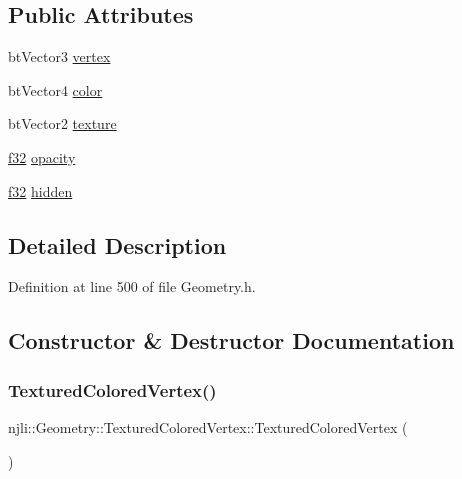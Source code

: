 \subsection*{Public Attributes}
\begin{DoxyCompactItemize}
\item 
bt\+Vector3 \mbox{\hyperlink{structnjli_1_1_geometry_1_1_textured_colored_vertex_ab49b5720f1cdbf1c63e62681db8f090f}{vertex}}
\item 
bt\+Vector4 \mbox{\hyperlink{structnjli_1_1_geometry_1_1_textured_colored_vertex_a79e6bb9cb0daa0307eac09b828e4d993}{color}}
\item 
bt\+Vector2 \mbox{\hyperlink{structnjli_1_1_geometry_1_1_textured_colored_vertex_a933ff52f4cd0a7768836e458f1a1218c}{texture}}
\item 
\mbox{\hyperlink{_util_8h_a5f6906312a689f27d70e9d086649d3fd}{f32}} \mbox{\hyperlink{structnjli_1_1_geometry_1_1_textured_colored_vertex_a8c7d91ac68083909b5116f7d130c39ca}{opacity}}
\item 
\mbox{\hyperlink{_util_8h_a5f6906312a689f27d70e9d086649d3fd}{f32}} \mbox{\hyperlink{structnjli_1_1_geometry_1_1_textured_colored_vertex_a506ec1fdd64c4b0530a33a53d075c3d2}{hidden}}
\end{DoxyCompactItemize}


\subsection{Detailed Description}


Definition at line 500 of file Geometry.\+h.



\subsection{Constructor \& Destructor Documentation}
\mbox{\label{structnjli_1_1_geometry_1_1_textured_colored_vertex_a9981d5820df41bf186e25f16fa856d12}} 
\subsubsection{\texorpdfstring{Textured\+Colored\+Vertex()}{TexturedColoredVertex()}\hspace{0.1cm}{\footnotesize\ttfamily [1/2]}}
{\footnotesize\ttfamily njli\+::\+Geometry\+::\+Textured\+Colored\+Vertex\+::\+Textured\+Colored\+Vertex (\begin{DoxyParamCaption}{ }\end{DoxyParamCaption})\hspace{0.3cm}{\ttfamily [inline]}}



